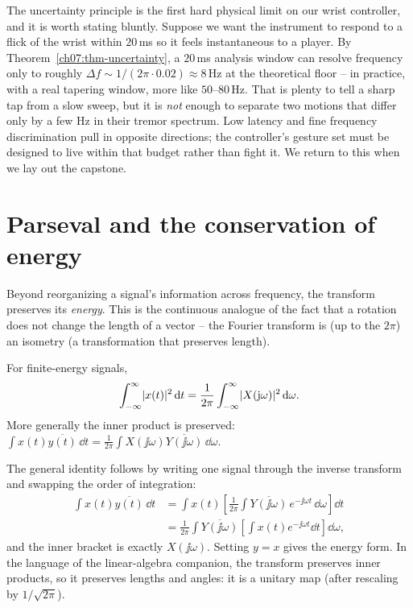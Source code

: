 \begin{goalbox}
The uncertainty principle is the first hard physical limit on our wrist controller, and
it is worth stating bluntly. Suppose we want the instrument to respond to a flick of the
wrist within $20\,$ms so it feels instantaneous to a player. By
Theorem~\ref{ch07:thm-uncertainty}, a $20\,$ms analysis window can resolve frequency only
to roughly $\Delta f \sim 1/(2\pi\cdot 0.02) \approx 8\,$Hz at the theoretical floor -- in
practice, with a real tapering window, more like $50$--$80\,$Hz. That is plenty to tell a
sharp tap from a slow sweep, but it is \emph{not} enough to separate two motions that
differ only by a few Hz in their tremor spectrum. Low latency and fine frequency
discrimination pull in opposite directions; the controller's gesture set must be designed
to live within that budget rather than fight it. We return to this when we lay out the
capstone.
\end{goalbox}

\section{Parseval and the conservation of energy}
\label{ch07:parseval}

Beyond reorganizing a signal's information across frequency, the transform preserves its
\emph{energy}. This is the continuous analogue of the fact that a rotation does not change
the length of a vector -- the Fourier transform is (up to the $2\pi$) an isometry (a transformation that preserves length).

\begin{theorem}
\label{ch07:thm-parseval}
For finite-energy signals,
\begin{equation}
\int_{-\infty}^{\infty}\lvert x(t)\rvert^2\,\mathrm{d} t
= \frac{1}{2\pi}\int_{-\infty}^{\infty}\lvert X(\mathrm{j}\omega)\rvert^2\,\mathrm{d}\omega .
\end{equation}
More generally the inner product is preserved:
$\int x(t)\overline{y(t)}\,\dd t = \frac{1}{2\pi}\int X(\jj\omega)\overline{Y(\jj\omega)}\,\dd\omega$.
\end{theorem}

\begin{whybox}
The general identity follows by writing one signal through the inverse transform and
swapping the order of integration:
\begin{align*}
\int x(t)\overline{y(t)}\,\dd t
&= \int x(t)\left[\frac{1}{2\pi}\int \overline{Y(\jj\omega)}\,e^{-\jj\omega t}\,\dd\omega\right]\dd t \\
&= \frac{1}{2\pi}\int \overline{Y(\jj\omega)}\left[\int x(t)e^{-\jj\omega t}\dd t\right]\dd\omega,
\end{align*}
and the inner bracket is exactly $X(\jj\omega)$. Setting $y=x$ gives the energy form. In
the language of the linear-algebra companion, the transform preserves inner products, so
it preserves lengths and angles: it is a unitary map (after rescaling by $1/\sqrt{2\pi}$).
\end{whybox}

